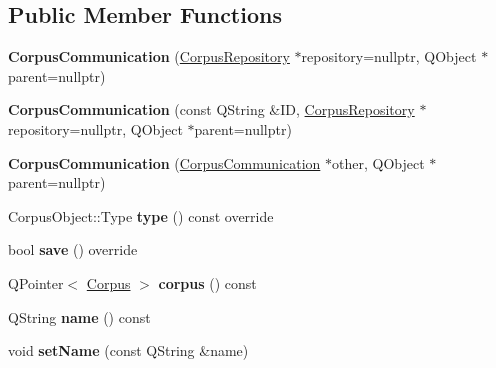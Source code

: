 \subsection*{Public Member Functions}
\begin{DoxyCompactItemize}
\item 
\mbox{\label{class_corpus_communication_ad31f58fabee0a614ee124c3b795bc3ad}} 
{\bfseries Corpus\+Communication} (\hyperlink{class_corpus_repository}{Corpus\+Repository} $\ast$repository=nullptr, Q\+Object $\ast$parent=nullptr)
\item 
\mbox{\label{class_corpus_communication_ae8e4b4e27772a2f65b0a6bdd90770d9a}} 
{\bfseries Corpus\+Communication} (const Q\+String \&ID, \hyperlink{class_corpus_repository}{Corpus\+Repository} $\ast$repository=nullptr, Q\+Object $\ast$parent=nullptr)
\item 
\mbox{\label{class_corpus_communication_a148919c92fd0bd530c02e21bc7b47cef}} 
{\bfseries Corpus\+Communication} (\hyperlink{class_corpus_communication}{Corpus\+Communication} $\ast$other, Q\+Object $\ast$parent=nullptr)
\item 
\mbox{\label{class_corpus_communication_aaf9f5021f355745621cc5b3723f97b88}} 
Corpus\+Object\+::\+Type {\bfseries type} () const override
\item 
\mbox{\label{class_corpus_communication_a8a492d78bd3da6e73ff117af82aeeb7f}} 
bool {\bfseries save} () override
\item 
\mbox{\label{class_corpus_communication_a645454b2fd643c5cb276cdc89d6c0b44}} 
Q\+Pointer$<$ \hyperlink{class_corpus}{Corpus} $>$ {\bfseries corpus} () const
\item 
\mbox{\label{class_corpus_communication_a6399e6c046291d2e2175044a98680b62}} 
Q\+String {\bfseries name} () const
\item 
\mbox{\label{class_corpus_communication_a7cb8ac67e54fd08f8cfb7659cfe4df20}} 
void {\bfseries set\+Name} (const Q\+String \&name)
\item 

\end{DoxyCompactItemize}
